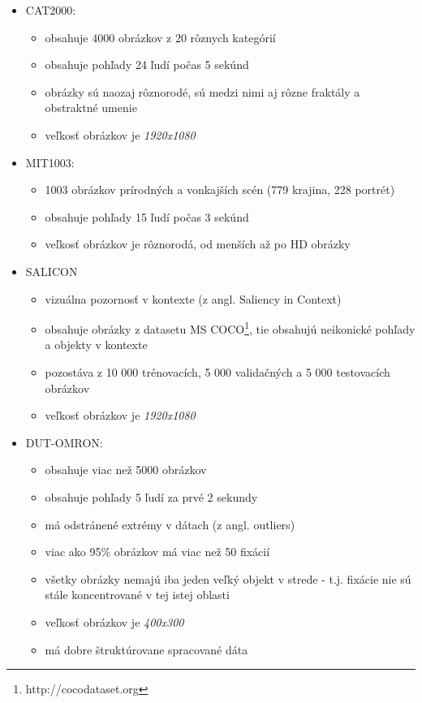 \begin{itemize}
	\item CAT2000\cite{cat2000}:
		\begin{itemize}
			\item obsahuje 4000 obrázkov z 20 rôznych kategórií
			\item obsahuje pohľady 24 ľudí počas 5 sekúnd
			\item obrázky sú naozaj rôznorodé, sú medzi nimi aj rôzne fraktály a obstraktné umenie
			\item veľkosť obrázkov je \textit{1920x1080}
		\end{itemize} 
	\item MIT1003\cite{mit1003}:
		\begin{itemize}
			\item 1003 obrázkov prírodných a vonkajších scén (779 krajina, 228 portrét)
			\item obsahuje pohľady 15 ľudí počas 3 sekúnd
			\item veľkosť obrázkov je rôznorodá, od menších až po HD obrázky
		\end{itemize} 
	\item SALICON\cite{salicon}
		\begin{itemize}
			\item vizuálna pozornosť v kontexte (z angl. Saliency in Context)
			\item obsahuje obrázky z datasetu MS COCO\footnote{http://cocodataset.org}, tie obsahujú neikonické pohľady a objekty v kontexte
			\item pozostáva z 10 000 trénovacích, 5 000 validačných a 5 000 testovacích obrázkov 
			\item veľkosť obrázkov je \textit{1920x1080}
		\end{itemize} 
	\item DUT-OMRON\cite{dut-omron}:
		\begin{itemize}
			\item obsahuje viac než 5000 obrázkov
			\item obsahuje pohľady 5 ľudí za prvé 2 sekundy
			\item má odstránené extrémy v dátach (z angl. outliers)
			\item viac ako 95\% obrázkov má viac než 50 fixácií
			\item všetky obrázky nemajú iba jeden veľký objekt v strede - t.j. fixácie nie sú stále koncentrované v tej istej oblasti
			\item veľkosť obrázkov je \textit{400x300}
			\item má dobre štruktúrovane spracované dáta
		\end{itemize} 
\end{itemize}

